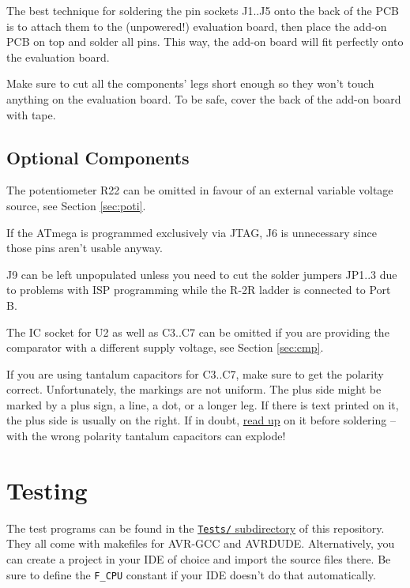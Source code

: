 \documentclass{article}
\newenvironment{note}{\begin{tcolorbox}[colback=blue!5!white,colframe=blue!75!black,title=\textbf{Note}]}{\end{tcolorbox}}
\newenvironment{caution}{\begin{tcolorbox}[colback=red!5!white,colframe=red!75!black,title=\textbf{Caution}]}{\end{tcolorbox}}
\newcommand{\file}[1]{\texttt{#1}}
\begin{document}
\begin{note}
The best technique for soldering the pin sockets J1..J5 onto the back of the PCB is to attach them to the (unpowered!) evaluation board, then place the add-on PCB on top and solder all pins. This way, the add-on board will fit perfectly onto the evaluation board. 
\end{note}

\begin{caution}
Make sure to cut all the components' legs short enough so they won't touch anything on the evaluation board. To be safe, cover the back of the add-on board with tape. 
\end{caution}

\subsection{Optional Components}
The potentiometer R22 can be omitted in favour of an external variable voltage source, see Section \ref{sec:poti}. 

If the ATmega is programmed exclusively via JTAG, J6 is unnecessary since those pins aren't usable anyway. 

J9 can be left unpopulated unless you need to cut the solder jumpers JP1..3 due to problems with ISP programming while the R-2R ladder is connected to Port B. 

The IC socket for U2 as well as C3..C7 can be omitted if you are providing the comparator with a different supply voltage, see Section \ref{sec:cmp}. 

If you are using tantalum capacitors for C3..C7, make sure to get the polarity correct. Unfortunately, the markings are not uniform. The plus side might be marked by a plus sign, a line, a dot, or a longer leg. If there is text printed on it, the plus side is usually on the right. If in doubt, \href{https://en.wikipedia.org/wiki/Tantalum_capacitor#Polarity_marking}{read up} on it before soldering -- with the wrong polarity tantalum capacitors can explode!

\section{Testing}
The test programs can be found in the \href{../Tests/}{\file{Tests/} subdirectory} of this repository. They all come with makefiles for AVR-GCC and AVRDUDE. Alternatively, you can create a project in your IDE of choice and import the source files there. Be sure to define the \lstinline[language=C]{F_CPU} constant if your IDE doesn't do that automatically.
\end{document}
